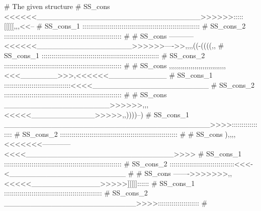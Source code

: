 \begin{sreoutput}
# The given structure
# SS_cons   <<<<<<_______________________________>>>>>>:::::[[[[[,,,<<--
# SS_cons_1 ::::::::::::::::::::::::::::::::::::::::::::::::::::::::::::
# SS_cons_2 ::::::::::::::::::::::::::::::::::::::::::::::::::::::::::::
#
# SS_cons   -----------<<<<<<__________________>>>>>>---->>,,,,((-((((,,
# SS_cons_1 ::::::::::::::::::::::::::::::::::::::::::::::::::::::::::::
# SS_cons_2 ::::::::::::::::::::::::::::::::::::::::::::::::::::::::::::
#
# SS_cons   ,,,,,,,,,,,,,,,,,,,,,,,,,,,,,<<<_______>>>,<<<<<<___________
# SS_cons_1 ::::::::::::::::::::::::::::::::::<<<<______________________
# SS_cons_2 ::::::::::::::::::::::::::::::::::::::::::::::::::::::::::::
#
# SS_cons   ____________________>>>>>>,,,<<<<<____________>>>>>,,))))--)
# SS_cons_1 _______________________________________>>>>:::::::::::::::::
# SS_cons_2 ::::::::::::::::::::::::::::::::::::::::::::::::::::::::::::
#
# SS_cons   ),,,,<<<<<<<------------<<<<____________________________>>>>
# SS_cons_1 ::::::::::::::::::::::::::::::::::::::::::::::::::::::::::::
# SS_cons_2 :::::::::::::::::::::::::::::::::<<<-<______________________
#
# SS_cons   ------->>>>>>>,,<<<<<_____________>>>>>]]]]]::::::
# SS_cons_1 ::::::::::::::::::::::::::::::::::::::::::::::::::
# SS_cons_2 _________________________>>>>:::::::::::::::::::::
#


\end{sreoutput}
